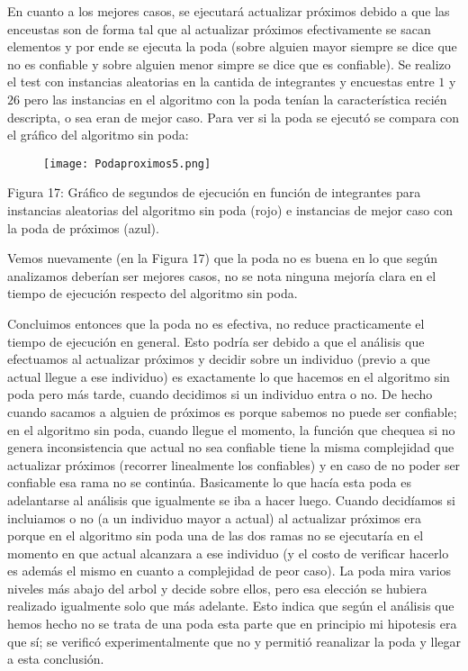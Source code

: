 \documentclass[A4paper,oneside,fleqn,10pt]{article}
\theoremstyle{definition}
\begin{document}
En cuanto a los mejores casos, se ejecutará actualizar próximos debido a que las enceustas son de forma tal  que al actualizar próximos efectivamente se sacan elementos y por ende se ejecuta la poda (sobre alguien mayor siempre se dice que no es confiable y sobre alguien menor simpre se dice que es confiable). Se realizo el test con instancias aleatorias en la cantida de integrantes y encuestas entre $1$ y $26$ pero las instancias en el algoritmo con la poda tenían la característica recién descripta, o sea eran de mejor caso. Para ver si la poda se ejecutó se compara con el gráfico del algoritmo sin poda: 

\clearpage


\begin{figure}[!ht]
  \texttt{[image: Podaproximos5.png]}
    \label{fig:boat17}
      
\end{figure}

\scriptsize

Figura 17: Gráfico de segundos de ejecución en función de integrantes para instancias aleatorias del algoritmo sin poda (rojo) e instancias de mejor caso con la poda de próximos (azul).

\normalsize

Vemos nuevamente (en la Figura 17) que la poda no es buena en lo que según analizamos deberían ser mejores casos, no se nota ninguna mejoría clara en el tiempo de ejecución respecto del algoritmo sin poda.

Concluimos entonces que la poda no es efectiva, no reduce practicamente el tiempo de ejecución en general. Esto podría ser debido a que el análisis que efectuamos al actualizar próximos y decidir sobre un individuo (previo a que actual llegue a ese individuo) es exactamente lo que hacemos en el algoritmo sin poda pero más tarde, cuando decidimos si un individuo entra o no. De hecho cuando sacamos a alguien de próximos es porque sabemos no puede ser confiable; en el algoritmo sin poda, cuando llegue el momento, la función que chequea si no genera inconsistencia que actual no sea confiable tiene la misma complejidad que actualizar próximos (recorrer linealmente los confiables) y en caso de no poder ser confiable esa rama no se continúa. Basicamente lo que hacía esta poda es adelantarse al análisis que igualmente se iba a hacer luego. Cuando decidíamos si incluiamos o no (a un individuo mayor a actual) al actualizar próximos era porque en el algoritmo sin poda una de las dos ramas no se ejecutaría en el momento en que actual alcanzara a ese individuo (y el costo de verificar hacerlo es además el mismo en cuanto a complejidad de peor caso). La poda mira varios niveles más abajo del arbol y decide sobre ellos, pero esa elección se hubiera realizado igualmente solo que más adelante. Esto indica que según el análisis que hemos hecho no se trata de una poda esta parte que en principio mi hipotesis era que sí; se verificó experimentalmente que no y permitió reanalizar la poda y llegar a esta conclusión.
\end{document}
